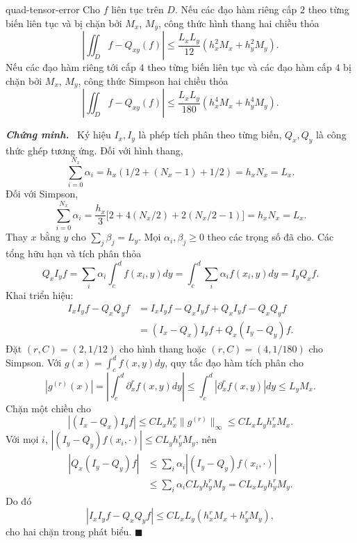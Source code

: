 \documentclass[12pt,a4paper,oneside]{book}
\numberwithin{algorithm}{chapter}
\theoremstyle{definition}
\newenvironment{chungminh}{\par\medskip\noindent\textbf{\textit{\color{mainblue}Chứng minh.}}\ }{\hfill$\blacksquare$\par\medskip}
\begin{document}
\begin{dinhly}{}{quad-tensor-error}
Cho $f$ liên tục trên $D$. Nếu các đạo hàm riêng cấp $2$ theo từng biến liên tục và bị chặn bởi $M_x$, $M_y$, công thức hình thang hai chiều thỏa
\[
 \left|\iint_Df-Q_{xy}(f)\right|
 \leq\frac{L_xL_y}{12}(h_x^2M_x+h_y^2M_y).
\]
Nếu các đạo hàm riêng tới cấp $4$ theo từng biến liên tục và các đạo hàm cấp $4$ bị chặn bởi $M_x$, $M_y$, công thức Simpson hai chiều thỏa
\[
 \left|\iint_Df-Q_{xy}(f)\right|
 \leq\frac{L_xL_y}{180}(h_x^4M_x+h_y^4M_y).
\]
\end{dinhly}
\begin{chungminh}
Ký hiệu $I_x,I_y$ là phép tích phân theo từng biến, $Q_x,Q_y$ là công thức ghép tương ứng. Đối với hình thang,
\[
 \sum_{i=0}^{N_x}\alpha_i=h_x(1/2+(N_x-1)+1/2)=h_xN_x=L_x.
\]
Đối với Simpson,
\[
 \sum_{i=0}^{N_x}\alpha_i
 =\frac{h_x}{3}\bigl[2+4(N_x/2)+2(N_x/2-1)\bigr]=h_xN_x=L_x.
\]
Thay $x$ bằng $y$ cho $\sum_j\beta_j=L_y$. Mọi $\alpha_i,\beta_j\geq0$ theo các trọng số đã cho. Các tổng hữu hạn và tích phân thỏa
\[
 Q_xI_yf=\sum_i\alpha_i\int_c^df(x_i,y)dy
 =\int_c^d\sum_i\alpha_if(x_i,y)dy=I_yQ_xf.
\]
Khai triển hiệu:
\begin{align*}
 I_xI_yf-Q_xQ_yf
 &=I_xI_yf-Q_xI_yf+Q_xI_yf-Q_xQ_yf\\
 &=(I_x-Q_x)I_yf+Q_x(I_y-Q_y)f.
\end{align*}
Đặt $(r,C)=(2,1/12)$ cho hình thang hoặc $(r,C)=(4,1/180)$ cho Simpson. Với $g(x)=\int_c^df(x,y)dy$, quy tắc đạo hàm tích phân cho
\[
 |g^{(r)}(x)|=\left|\int_c^d\partial_x^rf(x,y)dy\right|
 \leq\int_c^d|\partial_x^rf(x,y)|dy\leq L_yM_x.
\]
Chặn một chiều cho
\[
 |(I_x-Q_x)I_yf|\leq CL_xh_x^r\|g^{(r)}\|_\infty
 \leq CL_xL_yh_x^rM_x.
\]
Với mọi $i$, $|(I_y-Q_y)f(x_i,\cdot)|\leq CL_yh_y^rM_y$, nên
\begin{align*}
 |Q_x(I_y-Q_y)f|
 &\leq\sum_i\alpha_i|(I_y-Q_y)f(x_i,\cdot)|\\
 &\leq\sum_i\alpha_iCL_yh_y^rM_y=CL_xL_yh_y^rM_y.
\end{align*}
Do đó
\[
 |I_xI_yf-Q_xQ_yf|
 \leq CL_xL_y(h_x^rM_x+h_y^rM_y),
\]
cho hai chặn trong phát biểu.
\end{chungminh}
\end{document}
